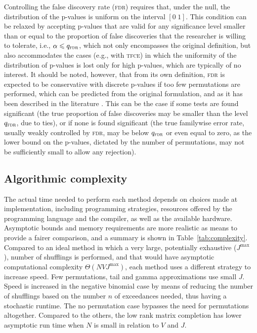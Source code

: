 Controlling the false discovery rate (\textsc{fdr}) \citep{Benjamini1995, Genovese2002} requires that, under the null, the distribution of the p-values is uniform on the interval $[0\;1]$. This condition can be relaxed by accepting p-values that are valid for any significance level smaller than or equal to the proportion of false discoveries that the researcher is willing to tolerate, i.e., $\alpha \leqslant q_{\textsc{fdr}}$, which not only encompasses the original definition, but also accommodates the cases (e.g., with \textsc{tfce}) in which the uniformity of the distribution of p-values is lost only for high p-values, which are typically of no interest. It should be noted, however, that from its own definition, \textsc{fdr} is expected to be conservative with discrete p-values if too few permutations are performed, which can be predicted from the original formulation, and as it has been described in the literature \citep{Gilbert2005}. This can be the case if some tests are found significant (the true proportion of false discoveries may be smaller than the level $q_{\textsc{fdr}}$, due to ties), or if none is found significant (the true familywise error rate, usually weakly controlled by \textsc{fdr}, may be below $q_{\textsc{fdr}}$ or even equal to zero, as the lower bound on the p-values, dictated by the number of permutations, may not be sufficiently small to allow any rejection).

\subsection{Algorithmic complexity}
\label{sec:accel:complexity}

The actual time needed to perform each method depends on choices made at implementation, including programming strategies, resources offered by the programming language and the compiler, as well as the available hardware. Asymptotic bounds and memory requirements are more realistic as means to provide a fairer comparison, and a summary is shown in Table~\ref{tab:complexity}. Compared to an ideal method in which a very large, potentially exhaustive ($J^{\text{max}}$), number of shufflings is performed, and that would have asymptotic computational complexity $\Theta(NVJ^{\text{max}})$, each method uses a different strategy to increase speed. Few permutations, tail and gamma approximations use small $J$. Speed is increased in the negative binomial case by means of reducing the number of shufflings based on the number $n$ of exceedances needed, thus having a stochastic runtime. The no permutation case bypasses the need for permutations altogether. Compared to the others, the low rank matrix completion has lower asymptotic run time when $N$ is small in relation to $V$ and $J$.


